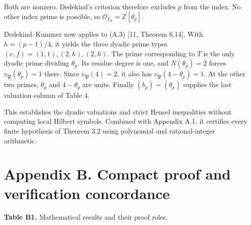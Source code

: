 \documentclass[11pt,a4paper]{article}
\begin{document}
Both are nonzero. Dedekind's criterion therefore excludes \(p\) from the
index. No other index prime is possible, so
\(\mathcal O_{L_p}=\mathbb Z[\theta_p]\).

Dedekind--Kummer now applies to (A.3) {[}11, Theorem 6.14{]}. With
\(h=(p-1)/4\), it yields the three dyadic prime types
\((e,f)=(1,1),(2,h),(2,h)\). The prime corresponding to \(T\) is the
only dyadic prime dividing \(\theta_p\). Its residue degree is one, and
\(N(\theta_p)=2\) forces \(v_{\mathfrak P}(\theta_p)=1\) there. Since
\(v_{\mathfrak P}(4)=2\), it also has \(v_{\mathfrak P}(4-\theta_p)=1\).
At the other two primes, \(\theta_p\) and \(4-\theta_p\) are units.
Finally \((b_p)=(\theta_p)\) supplies the last valuation column of Table
4.

This establishes the dyadic valuations and strict Hensel inequalities
without computing local Hilbert symbols. Combined with Appendix A.1, it
certifies every finite hypothesis of Theorem 3.2 using polynomial and
rational-integer arithmetic.

\section{Appendix B. Compact proof and verification
concordance}\label{verification-concordance}

\textbf{Table B1.} Mathematical results and their proof roles.
\end{document}
